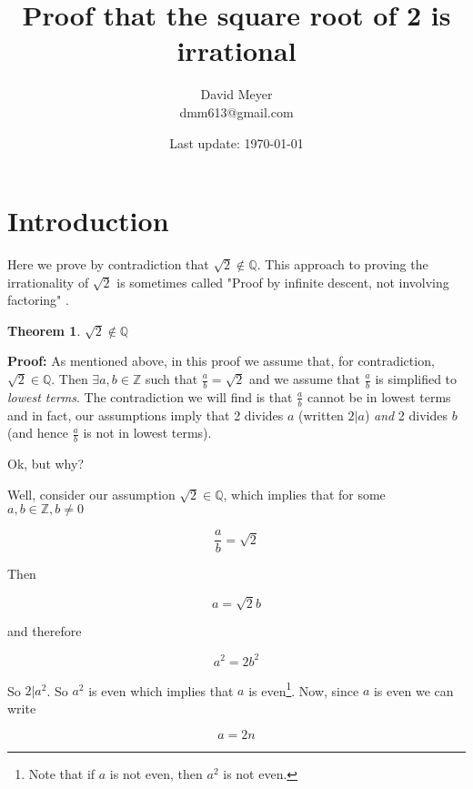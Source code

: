 \documentclass[11pt, oneside]{article}   	%
\title{Proof that the square root of 2 is irrational}
\author{David Meyer \\ dmm613@gmail.com}
\date{Last update: \today}							%
\theoremstyle{definition}
\newtheorem{thm}{Theorem}[section]
\begin{document}
\maketitle

\section{Introduction}
Here we prove by contradiction that $\sqrt{2} \notin
\mathbb{Q}$. This approach to proving the irrationality of
$\sqrt{2}$ is sometimes called "Proof by infinite descent, not
involving factoring" \cite{wiki:sqrt2}.

\begin{thm}
$\sqrt{2} \notin \mathbb{Q}$
\end{thm}

\noindent
\textbf{Proof:} As mentioned above, in this proof we assume that,
for contradiction, $\sqrt{2} \in \mathbb{Q}$. Then $\exists a,b
\in \mathbb{Z}$ such that $\frac{a}{b} = \sqrt{2}$ and we assume
that $\frac{a}{b}$ is simplified to \emph{lowest terms}. The
contradiction we will find is that $\frac{a}{b}$ cannot be in
lowest terms and in fact, our assumptions imply that 2 divides $a$
(written $2|a$) \emph{and} 2 divides $b$ (and hence $\frac{a}{b}$
is not in lowest terms). 


\bigskip
\noindent
Ok, but why?


\bigskip
\noindent
Well, consider our assumption $\sqrt{2} \in \mathbb{Q}$, which
implies that for some $a,b \in \mathbb{Z}, b \neq 0$ 

\bigskip
\begin{equation*}
\frac{a}{b} = \sqrt{2}
\end{equation*}


\bigskip
\noindent
Then 

\begin{equation*}
a = \sqrt{2} b
\end{equation*}

\bigskip
\noindent
and therefore 

\begin{equation}
a^2 = 2b^2
\label{eqn:squared}
\end{equation}

\bigskip
\noindent
So $2|a^2$. So $a^2$ is even which implies that $a$ is
even\footnote{Note that if $a$ is not even, then $a^2$ is not
even.}. Now, since $a$ is even we can write

\begin{equation}
a = 2n
\label{eqn:a}
\end{equation}
\end{document}
